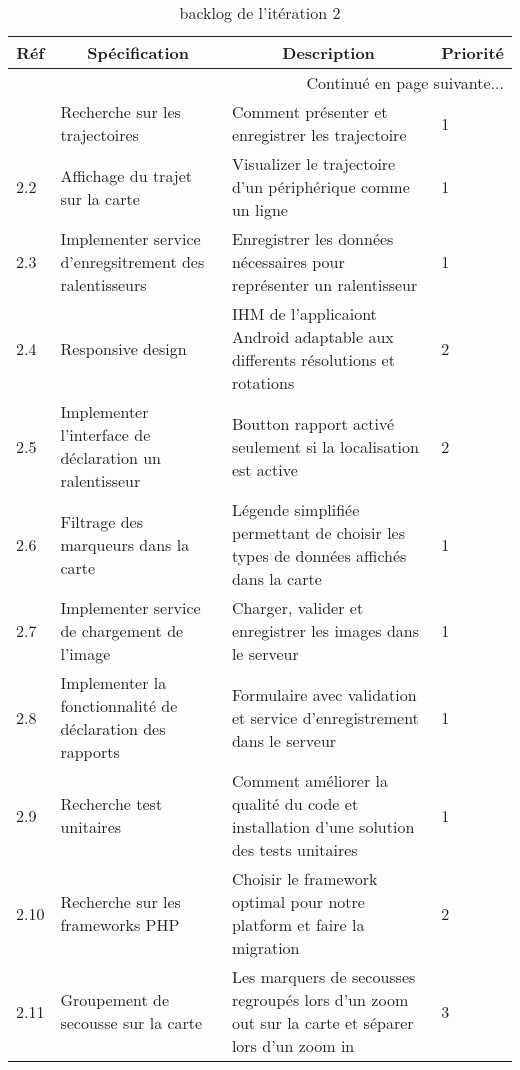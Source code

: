 \begin{center}
    \footnotesize
    \begin{longtable}{| p{1cm} | p{5cm} | p{7cm} | p{1cm} |}
        \caption{backlog de l'itération 2}
        \label{tab:sprint2-backlog} \\

        \hline
        \multicolumn{1}{|c}{\textbf{Réf}} &
        \multicolumn{1}{|c}{\textbf{Spécification}} &
        \multicolumn{1}{|c}{\textbf{Description}} &
        \multicolumn{1}{|c|}{\textbf{Priorité}} \\ \hline
        \endhead

        \hline \multicolumn{4}{|r|}{{Continué en page suivante$\dotsc$}} \\ \hline
        \endfoot

        \hline \hline
        \endlastfoot

        \hline
2.1 & Recherche sur les trajectoires & Comment présenter et enregistrer les trajectoire & 1 \\ \hline
2.2 & Affichage du trajet sur la carte & Visualizer le trajectoire d'un périphérique comme un ligne & 1 \\ \hline
2.3 & Implementer service d'enregsitrement des ralentisseurs & Enregistrer les données nécessaires pour représenter un ralentisseur & 1 \\ \hline
2.4 & Responsive design & IHM de l'applicaiont Android adaptable aux differents résolutions et rotations & 2 \\ \hline
2.5 & Implementer l'interface de déclaration un ralentisseur & Boutton rapport activé seulement si la localisation est active & 2 \\ \hline
2.6 & Filtrage des marqueurs dans la carte & Légende simplifiée permettant de choisir les types de données affichés dans la carte & 1 \\ \hline
2.7 & Implementer service de chargement de l'image & Charger, valider et enregistrer les images dans le serveur & 1 \\ \hline
2.8 & Implementer la fonctionnalité de déclaration des rapports & Formulaire avec validation et service d'enregistrement dans le serveur & 1 \\ \hline
2.9 & Recherche test unitaires & Comment améliorer la qualité du code et installation d'une solution des tests unitaires & 1 \\ \hline
2.10 & Recherche sur les frameworks PHP & Choisir le framework optimal pour notre platform et faire la migration & 2 \\ \hline
2.11 & Groupement de secousse sur la carte & Les marquers de secousses regroupés lors d'un zoom out sur la carte et séparer lors d'un zoom in & 3 \\ \hline
    \end{longtable}
\end{center}

